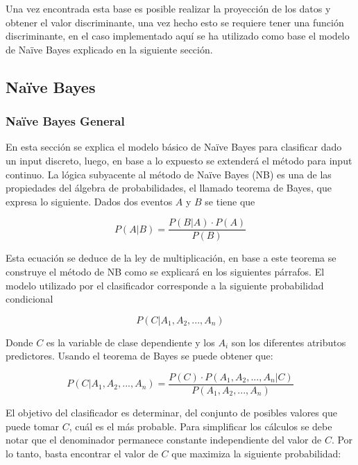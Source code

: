 \documentclass[letter, titlepage, 10pt]{article}
\begin{document}
Una vez encontrada esta base es posible realizar la proyección de los datos y obtener el valor discriminante, una vez hecho esto se requiere tener una función discriminante, en el caso implementado aquí se ha utilizado como base el modelo de Naïve Bayes explicado en la siguiente sección.


\subsection{Naïve Bayes}
	\subsubsection{Naïve Bayes General}
	En esta sección se explica el modelo básico de Naïve Bayes para clasificar dado un input discreto, luego, en base a lo expuesto se extenderá el método para input continuo.
	La lógica subyacente al método de Naïve Bayes (NB) es una de las propiedades del álgebra de probabilidades, el llamado teorema de Bayes, que expresa lo siguiente. Dados dos eventos $A$ y $B$ se tiene que

\begin{equation}
P(A|B) = \frac{P(B|A)\cdot P(A)}{P(B)}
\end{equation}

Esta ecuación se deduce de la ley de multiplicación, en base a este teorema se construye el método de NB como se explicará en los siguientes párrafos. 
El modelo utilizado por el clasificador corresponde a la siguiente probabilidad condicional

\begin{equation}
P(C|A_1,A_2,...,A_n)
\end{equation}

Donde $C$ es la variable de clase dependiente y los $A_i$ son los diferentes atributos predictores. Usando el teorema de Bayes se puede obtener que: 

\begin{equation} \label{equation:CondProbability}
P(C|A_1,A_2,...,A_n) = \frac{P(C)\cdot P(A_1,A_2,...,A_n|C)}{P(A_1,A_2,...,A_n)}
\end{equation}

El objetivo del clasificador es determinar, del conjunto de posibles valores que puede tomar $C$, cuál es el más probable. Para simplificar los cálculos se debe notar que el denominador permanece constante independiente del valor de $C$. Por lo tanto, basta encontrar el valor de $C$ que maximiza la siguiente probabilidad:
\end{document}

